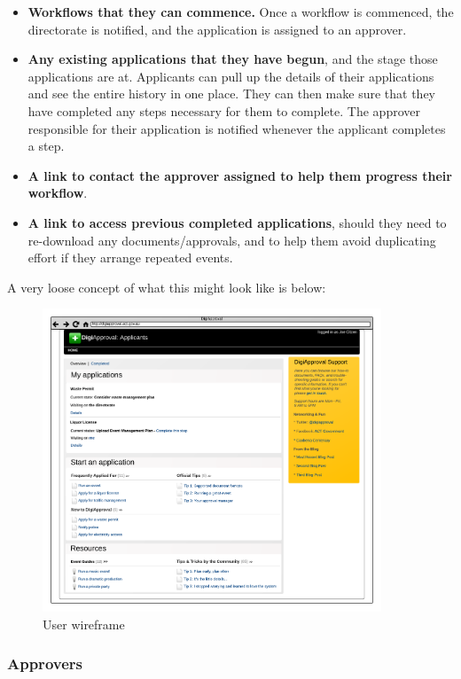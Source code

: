 \documentclass[12pt,a4paper,twosided]{article}
\begin{document}
\begin{itemize}
\itemsep1pt\parskip0pt
\item
  \textbf{Workflows that they can commence.} Once a workflow is
  commenced, the directorate is notified, and the application is
  assigned to an approver.
\item
  \textbf{Any existing applications that they have begun}, and the stage
  those applications are at. Applicants can pull up the details of their
  applications and see the entire history in one place. They can then
  make sure that they have completed any steps necessary for them to
  complete. The approver responsible for their application is notified
  whenever the applicant completes a step.
\item
  \textbf{A link to contact the approver assigned to help them progress
  their workflow}.
\item
  \textbf{A link to access previous completed applications}, should they
  need to re-download any documents/approvals, and to help them avoid
  duplicating effort if they arrange repeated events.
\end{itemize}

A very loose concept of what this might look like is below:

\begin{figure}[htbp]
\centering
\includegraphics[width=0.9\textwidth]{./imgs/user-wireframe.png}
\caption{User wireframe}
\end{figure}

\subsubsection{Approvers}
\end{document}
